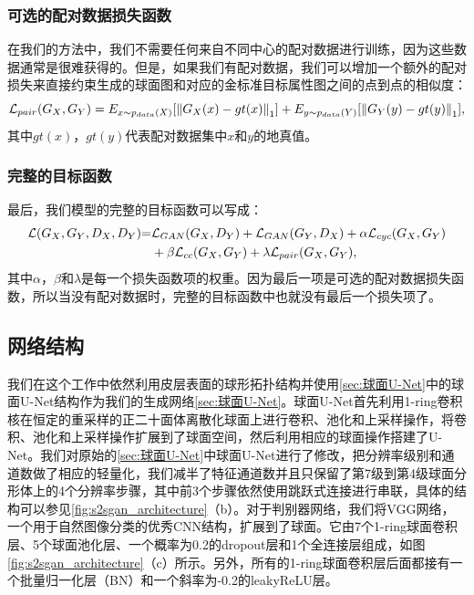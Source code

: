 \subsubsection{可选的配对数据损失函数}
在我们的方法中，我们不需要任何来自不同中心的配对数据进行训练，因为这些数据通常是很难获得的。但是，如果我们有配对数据，我们可以增加一个额外的配对损失来直接约束生成的球面图和对应的金标准目标属性图之间的点到点的相似度：
\begin{equation}
	{{\cal L}_{pair}}({G_X},{G_Y}) = {E_{x\sim{p_{data}}(X)}}[{\left\| {{G_X}(x) - gt(x)} \right\|_1}] + {E_{y\sim{p_{data}}(Y)}}[{\left\| {{G_Y}(y) - gt(y)} \right\|_1}],
\end{equation}
其中$gt(x)$，$gt(y)$代表配对数据集中$x$和$y$的地真值。
	
\subsubsection{完整的目标函数} 
最后，我们模型的完整的目标函数可以写成：
\begin{equation}
\begin{split}
    {\cal L}({G_X},{G_Y},{D_X},{D_Y}){\rm{ = }} & {{\cal L}_{GAN}}({G_X},{D_Y}) + {{\cal L}_{GAN}}({G_Y},{D_X}) + \alpha {{\cal L}_{cyc}}({G_X},{G_Y})  \\
    & +\beta {{\cal L}_{cc}}({G_X},{G_Y}) + \lambda {{\cal L}_{pair}}({G_X},{G_Y}),
\end{split}
\end{equation}
其中$\alpha$，$\beta$和$\lambda$是每一个损失函数项的权重。因为最后一项是可选的配对数据损失函数，所以当没有配对数据时，完整的目标函数中也就没有最后一个损失项了。
	
\subsection{网络结构}
我们在这个工作中依然利用皮层表面的球形拓扑结构并使用\ref{sec:球面U-Net}中的球面U-Net结构作为我们的生成网络\ref{sec:球面U-Net}。球面U-Net首先利用1-ring卷积核在恒定的重采样的正二十面体离散化球面上进行卷积、池化和上采样操作，将卷积、池化和上采样操作扩展到了球面空间，然后利用相应的球面操作搭建了U-Net。我们对原始的\ref{sec:球面U-Net}中球面U-Net进行了修改，把分辨率级别和通道数做了相应的轻量化，我们减半了特征通道数并且只保留了第7级到第4级球面分形体上的4个分辨率步骤，其中前3个步骤依然使用跳跃式连接进行串联，具体的结构可以参见\ref{fig:s2sgan_architecture}（b）。对于判别器网络，我们将VGG\cite{simonyan2014very}网络，一个用于自然图像分类的优秀CNN结构，扩展到了球面。它由7个1-ring球面卷积层、5个球面池化层、一个概率为0.2的dropout层和1个全连接层组成，如图\ref{fig:s2sgan_architecture}（c）所示。另外，所有的1-ring球面卷积层后面都接有一个批量归一化层（BN）和一个斜率为-0.2的leakyReLU层。

